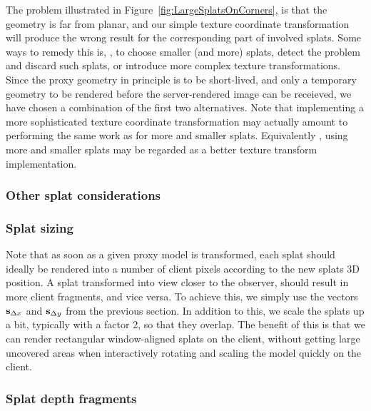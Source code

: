 The problem illustrated in Figure~\ref{fig:LargeSplatsOnCorners}, is that the
geometry is far from planar, and our simple texture coordinate transformation
will produce the wrong result for the corresponding part of involved
splats. Some ways to remedy this is, \eg, to choose smaller (and more) splats,
detect the problem and discard such splats, or introduce more complex texture
transformations. Since the proxy geometry in principle is to be short-lived, and
only a temporary geometry to be rendered before the server-rendered image can be
receieved, we have chosen a combination of the first two alternatives. Note that
implementing a more sophisticated texture coordinate transformation may actually
amount to performing the same work as for more and smaller splats. Equivalently
, using more and smaller splats may be regarded as a better texture transform
implementation.


\subsubsection{Other splat considerations}



\subsubsection{Splat sizing}

Note that as soon as a given proxy model is transformed, each splat should
ideally be rendered into a number of client pixels according to the new splats
3D position. A splat transformed into view closer to the observer, should result
in more client fragments, and vice versa. To achieve this, we simply use the
vectors $\mathbf{s}_{\Delta x}$ and $\mathbf{s}_{\Delta y}$ from the previous section.
In addition to this, we scale the splats up a bit, typically with a factor 2, so
that they overlap. The benefit of this is that we can render rectangular
window-aligned splats on the client, without getting large uncovered areas when
interactively rotating and scaling the model quickly on the client.


\subsubsection{Splat depth fragments}

